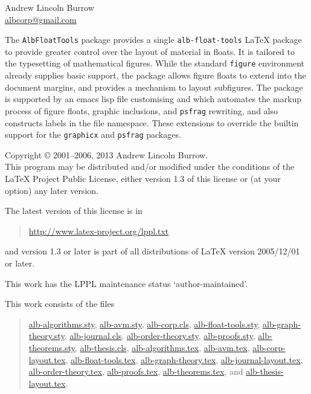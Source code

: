\documentclass[11pt,a4paper,oneside,titlepage]{alb-corp}
\begin{document}


\begin{albTitlePage}


  Andrew Lincoln Burrow\\
  \url{albcorp@gmail.com}



  The \texttt{AlbFloatTools} package provides a single
  \texttt{alb-float-tools} \LaTeX{} package to provide greater control
  over the layout of material in floats.  It is tailored to the
  typesetting of mathematical figures.  While the standard
  \texttt{figure} environment already supplies basic support, the
  package allows figure floats to extend into the document margins, and
  provides a mechanism to layout subfigures.  The package is supported
  by an emacs lisp file customising \AUCTeX{} and \RefTeX{} which
  automates the markup process of figure floats, graphic inclusions, and
  \texttt{psfrag} rewriting, and also constructs labels in the file
  namespace.  These extensions to \AUCTeX{} override the builtin support
  for the \texttt{graphicx} and \texttt{psfrag} packages.



  Copyright \copyright{} 2001--2006, 2013 Andrew Lincoln Burrow.\\
  This program may be distributed and/or modified under the conditions
  of the \LaTeX{} Project Public License, either version 1.3 of this
  license or (at your option) any later version.

  \medskip{}

  The latest version of this license is in
  \begin{quote}
    \url{http://www.latex-project.org/lppl.txt}
  \end{quote}
  and version 1.3 or later is part of all distributions of LaTeX version
  2005/12/01 or later.

  \medskip{}

  This work has the LPPL maintenance status `author-maintained'.

  \medskip{}

  This work consists of the files
  \begin{quote}
    \begin{flushleft}
      \url{alb-algorithms.sty}, \url{alb-avm.sty}, \url{alb-corp.cls},
      \url{alb-float-tools.sty}, \url{alb-graph-theory.sty},
      \url{alb-journal.cls}, \url{alb-order-theory.sty},
      \url{alb-proofs.sty}, \url{alb-theorems.sty},
      \url{alb-thesis.cls}, \url{alb-algorithms.tex}, \url{alb-avm.tex},
      \url{alb-corp-layout.tex}, \url{alb-float-tools.tex},
      \url{alb-graph-theory.tex}, \url{alb-journal-layout.tex},
      \url{alb-order-theory.tex}, \url{alb-proofs.tex},
      \url{alb-theorems.tex}, and \url{alb-thesis-layout.tex}.
    \end{flushleft}
  \end{quote}



\end{albTitlePage}
\end{document}
